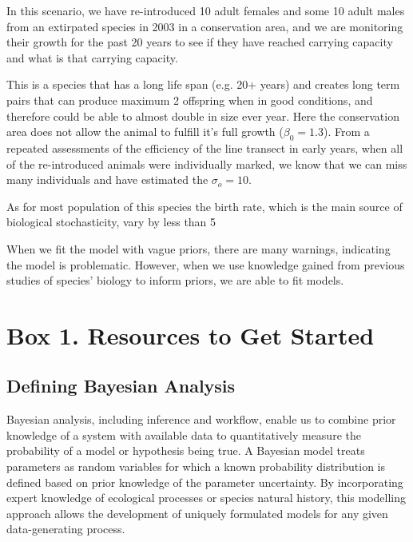 \documentclass{article}
\begin{document}
\par In this scenario, we have re-introduced 10 adult females and some 10 adult males from an extirpated species in 2003 in a conservation area, and we are monitoring their growth for the past 20 years to see if they have reached carrying capacity and what is that carrying capacity.

\par This is a species that has a long life span (e.g. 20+ years) and creates long term pairs  that can produce maximum 2 offspring when in good conditions, and therefore could be able to almost double in size ever year. Here the conservation area does not allow the animal to fulfill it's full growth ($\beta_0 = 1.3$). From a repeated assessments of the efficiency of the line transect in early years, when all of the re-introduced animals were individually marked, we know that we can miss many individuals and have estimated the $\sigma_o = 10$.

\par As for most population of this species the birth rate, which is the main source of biological stochasticity, vary by less than 5%

\par When we fit the model with vague priors, there are many warnings, indicating the model is problematic. However, when we use knowledge gained from previous studies of species' biology to inform priors, we are able to fit models.

\par 
\section* {Box 1. Resources to Get Started}
\subsection*{Defining Bayesian Analysis}

Bayesian analysis, including inference and workflow, enable us to combine prior knowledge of a system with available data to quantitatively measure the probability of a model or hypothesis being true. A Bayesian model treats parameters as random variables for which a known probability distribution is defined based on prior knowledge of the parameter uncertainty. By incorporating expert knowledge of ecological processes or species natural history, this modelling approach allows the development of uniquely formulated models for any given data-generating process.\\
\end{document}
